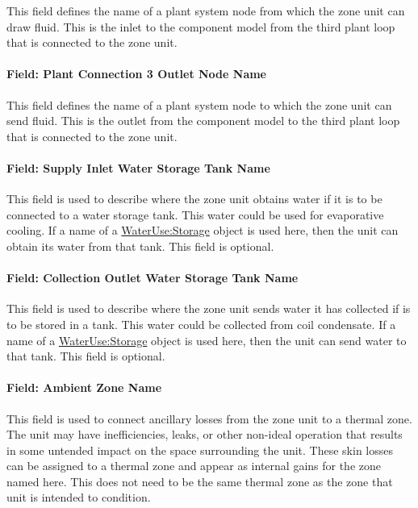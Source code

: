 This field defines the name of a plant system node from which the zone unit can draw fluid. This is the inlet to the component model from the third plant loop that is connected to the zone unit.

\paragraph{Field: Plant Connection 3 Outlet Node Name}\label{field-plant-connection-3-outlet-node-name}

This field defines the name of a plant system node to which the zone unit can send fluid. This is the outlet from the component model to the third plant loop that is connected to the zone unit.

\paragraph{Field: Supply Inlet Water Storage Tank Name}\label{field-supply-inlet-water-storage-tank-name}

This field is used to describe where the zone unit obtains water if it is to be connected to a water storage tank. This water could be used for evaporative cooling. If a name of a \hyperref[waterusestorage]{WaterUse:Storage} object is used here, then the unit can obtain its water from that tank. This field is optional.

\paragraph{Field: Collection Outlet Water Storage Tank Name}\label{field-collection-outlet-water-storage-tank-name}

This field is used to describe where the zone unit sends water it has collected if is to be stored in a tank. This water could be collected from coil condensate. If a name of a \hyperref[waterusestorage]{WaterUse:Storage} object is used here, then the unit can send water to that tank. This field is optional.

\paragraph{Field: Ambient Zone Name}\label{field-ambient-zone-name}

This field is used to connect ancillary losses from the zone unit to a thermal zone. The unit may have inefficiencies, leaks, or other non-ideal operation that results in some untended impact on the space surrounding the unit. These skin losses can be assigned to a thermal zone and appear as internal gains for the zone named here. This does not need to be the same thermal zone as the zone that unit is intended to condition.

